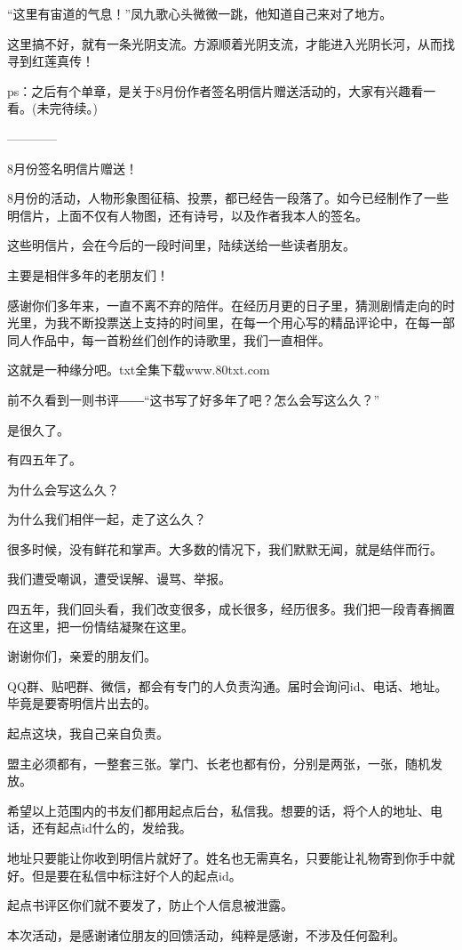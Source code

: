 \begin{this_body}
“这里有宙道的气息！”凤九歌心头微微一跳，他知道自己来对了地方。

这里搞不好，就有一条光阴支流。方源顺着光阴支流，才能进入光阴长河，从而找寻到红莲真传！

ps：之后有个单章，是关于8月份作者签名明信片赠送活动的，大家有兴趣看一看。(未完待续。)

------------

8月份签名明信片赠送！

8月份的活动，人物形象图征稿、投票，都已经告一段落了。如今已经制作了一些明信片，上面不仅有人物图，还有诗号，以及作者我本人的签名。

这些明信片，会在今后的一段时间里，陆续送给一些读者朋友。

主要是相伴多年的老朋友们！

感谢你们多年来，一直不离不弃的陪伴。在经历月更的日子里，猜测剧情走向的时光里，为我不断投票送上支持的时间里，在每一个用心写的精品评论中，在每一部同人作品中，每一首粉丝们创作的诗歌里，我们一直相伴。

这就是一种缘分吧。txt全集下载www.80txt.com

前不久看到一则书评――“这书写了好多年了吧？怎么会写这么久？”

是很久了。

有四五年了。

为什么会写这么久？

为什么我们相伴一起，走了这么久？

很多时候，没有鲜花和掌声。大多数的情况下，我们默默无闻，就是结伴而行。

我们遭受嘲讽，遭受误解、谩骂、举报。

四五年，我们回头看，我们改变很多，成长很多，经历很多。我们把一段青春搁置在这里，把一份情结凝聚在这里。

谢谢你们，亲爱的朋友们。

QQ群、贴吧群、微信，都会有专门的人负责沟通。届时会询问id、电话、地址。毕竟是要寄明信片出去的。

起点这块，我自己亲自负责。

盟主必须都有，一整套三张。掌门、长老也都有份，分别是两张，一张，随机发放。

希望以上范围内的书友们都用起点后台，私信我。想要的话，将个人的地址、电话，还有起点id什么的，发给我。

地址只要能让你收到明信片就好了。姓名也无需真名，只要能让礼物寄到你手中就好。但是要在私信中标注好个人的起点id。

起点书评区你们就不要发了，防止个人信息被泄露。

本次活动，是感谢诸位朋友的回馈活动，纯粹是感谢，不涉及任何盈利。


\end{this_body}
